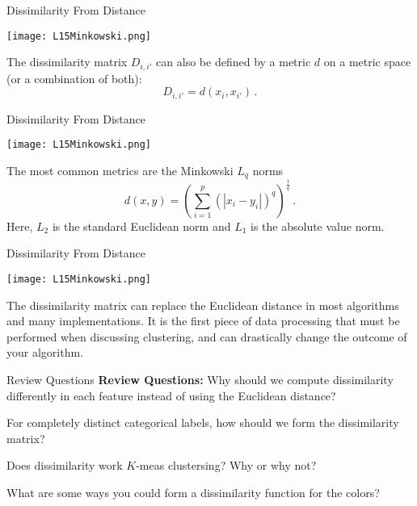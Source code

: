 \documentclass[10pt, table, dvipsnames,xcdraw, handout]{beamer}
\begin{document}
\begin{frame}[fragile]{Dissimilarity From Distance}
  \begin{minipage}[t][0.5\textheight][t]{\textwidth}
	\centering \texttt{[image: L15Minkowski.png]} 
  \end{minipage}
  \vfill
\begin{minipage}[t][0.5\textheight][t]{\textwidth}
The dissimilarity matrix $D_{i,i'}$ can also be defined by a metric $d$ on a metric space (or a combination of both):
$$
D_{i,i'} = d(x_i,x_{i'})\,.
$$
\end{minipage}
\end{frame}


\begin{frame}[fragile]{Dissimilarity From Distance}
  \begin{minipage}[t][0.5\textheight][t]{\textwidth}
	\centering \texttt{[image: L15Minkowski.png]} 
  \end{minipage}
  \vfill
\begin{minipage}[t][0.5\textheight][t]{\textwidth}
The most common metrics are the Minkowski $L_q$ norms
$$
d(x,y) = \left(\sum_{i = 1}^p (|x_i - y_i|)^{q}\right)^{\frac{1}q}\,.
$$
Here, $L_2$ is the standard Euclidean norm and $L_1$ is the absolute value norm. 
\end{minipage}
\end{frame}


\begin{frame}[fragile]{Dissimilarity From Distance}
  \begin{minipage}[t][0.5\textheight][t]{\textwidth}
	\centering \texttt{[image: L15Minkowski.png]} 
  \end{minipage}
  \vfill
\begin{minipage}[t][0.5\textheight][t]{\textwidth}
The dissimilarity matrix can replace the Euclidean distance in most algorithms and many implementations. It is the first piece of data processing that must be performed when discussing clustering, and can drastically change the outcome of your algorithm. 
\end{minipage}
\end{frame}

\begin{frame}[fragile]{Review Questions}
\textbf{Review Questions:}
Why should we compute dissimilarity differently in each feature instead of using the Euclidean distance?

For completely distinct categorical labels, how should we form the dissimilarity matrix?

Does dissimilarity work $K$-meas clustersing? Why or why not?

What are some ways you could form a dissimilarity function for the colors?


\end{frame}
\end{document}
